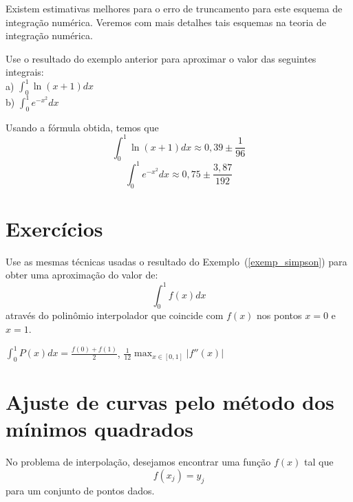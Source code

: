 \begin{obs}Existem estimativas melhores para o erro de truncamento para este esquema de integração numérica. Veremos com mais detalhes tais esquemas na teoria de integração numérica.
\end{obs}

\begin{ex}
Use o resultado do exemplo anterior para aproximar o valor das seguintes integrais:\\

a) $\displaystyle \int_0^1 \ln(x+1) dx$\\

b) $\displaystyle \int_0^1 e^{-x^2}dx$

\end{ex}
\begin{sol}
Usando a fórmula obtida, temos que
$$
\int_0^1\ln(x+1) dx \approx 0,39\pm \frac{1}{96}
$$
$$
\int_0^1 e^{-x^2} dx \approx 0,75\pm \frac{3,87}{192}
$$  
\end{sol}

\section*{Exercícios}

\begin{Exercise}
  Use as mesmas técnicas usadas o resultado do Exemplo~(\ref{exemp_simpson}) para obter uma aproximação do valor de:
  \begin{equation*}
    \int_0^1 f(x)dx
  \end{equation*}
através do polinômio interpolador que coincide com $f(x)$ nos pontos $x=0$ e $x=1$.
\end{Exercise}
\begin{Answer}
  \begin{tiny}
  $\int_0^1 P(x)dx =\frac{f(0)+f(1)}{2}$, $\frac{1}{12}\max_{x\in[0,1]}|f''(x)|$  
  \end{tiny}
\end{Answer}

\section{Ajuste de curvas pelo método dos mínimos quadrados}

No problema de interpolação, desejamos encontrar uma função $f(x)$ tal que
$$f(x_j)=y_j$$
para um conjunto de pontos dados.


